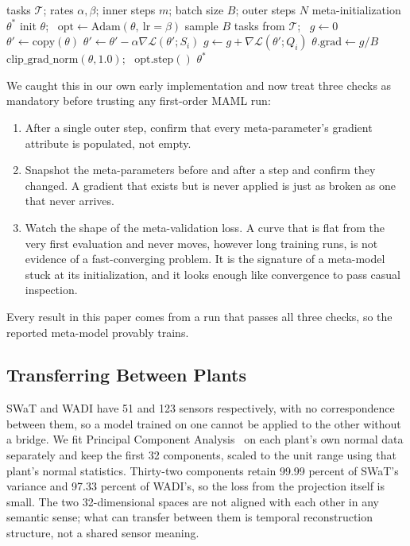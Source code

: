 \documentclass[conference]{IEEEtran}
\begin{document}
\begin{algorithm}[t]
\caption{Corrected First-Order MAML Meta-Training}
\label{alg:fomaml}
\begin{algorithmic}[1]
\Require tasks $\mathcal{T}$; rates $\alpha,\beta$; inner steps $m$; batch
size $B$; outer steps $N$
\Ensure meta-initialization $\theta^{*}$
\State init $\theta$; \ $\mathrm{opt}\gets\mathrm{Adam}(\theta,\ \mathrm{lr}{=}\beta)$
  \State sample $B$ tasks from $\mathcal{T}$; \ $g\gets 0$
    \State $\theta'\gets\mathrm{copy}(\theta)$
      \State $\theta'\gets\theta'-\alpha\nabla\mathcal{L}(\theta';S_i)$
    \EndFor
    \State $g\gets g+\nabla\mathcal{L}(\theta';Q_i)$ 
  \EndFor
  \State $\theta.\mathrm{grad}\gets g/B$ 
  \State $\mathrm{clip\_grad\_norm}(\theta,1.0)$; \ $\mathrm{opt.step}()$
\EndFor
\State \Return $\theta^{*}$
\end{algorithmic}
\end{algorithm}

We caught this in our own early implementation and now treat three checks
as mandatory before trusting any first-order MAML run:
\begin{enumerate}
\item After a single outer step, confirm that every meta-parameter's
gradient attribute is populated, not empty.
\item Snapshot the meta-parameters before and after a step and confirm they
changed. A gradient that exists but is never applied is just as broken as
one that never arrives.
\item Watch the shape of the meta-validation loss. A curve that is flat from
the very first evaluation and never moves, however long training runs, is
not evidence of a fast-converging problem. It is the signature of a
meta-model stuck at its initialization, and it looks enough like
convergence to pass casual inspection.
\end{enumerate}
Every result in this paper comes from a run that passes all three checks,
so the reported meta-model provably trains.

\subsection{Transferring Between Plants}

SWaT and WADI have 51 and 123 sensors respectively, with no correspondence
between them, so a model trained on one cannot be applied to the other
without a bridge. We fit Principal Component Analysis~\cite{jolliffe2016} on
each plant's own normal data separately and keep the first 32 components,
scaled to the unit range using that plant's normal statistics. Thirty-two
components retain 99.99 percent of SWaT's variance and 97.33 percent of
WADI's, so the loss from the projection itself is small. The two
32-dimensional spaces are not aligned with each other in any semantic sense;
what can transfer between them is temporal reconstruction structure, not a
shared sensor meaning.
\end{document}
